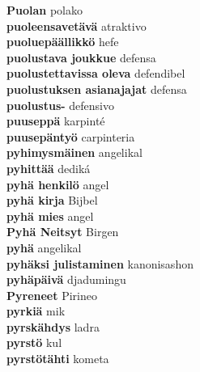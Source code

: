 \textbf{ Puolan  } polako \\
\textbf{ puoleensavetävä  } atraktivo \\
\textbf{ puoluepäällikkö  } hefe \\
\textbf{ puolustava joukkue  } defensa \\
\textbf{ puolustettavissa oleva  } defendibel \\
\textbf{ puolustuksen asianajajat  } defensa \\
\textbf{ puolustus-  } defensivo \\
\textbf{ puuseppä  } karpinté \\
\textbf{ puusepäntyö  } carpinteria \\
\textbf{ pyhimysmäinen  } angelikal \\
\textbf{ pyhittää  } dediká \\
\textbf{ pyhä henkilö  } angel \\
\textbf{ pyhä kirja  } Bijbel \\
\textbf{ pyhä mies  } angel \\
\textbf{ Pyhä Neitsyt  } Birgen \\
\textbf{ pyhä  } angelikal \\
\textbf{ pyhäksi julistaminen  } kanonisashon \\
\textbf{ pyhäpäivä  } djadumingu \\
\textbf{ Pyreneet  } Pirineo \\
\textbf{ pyrkiä  } mik \\
\textbf{ pyrskähdys  } ladra \\
\textbf{ pyrstö  } kul \\
\textbf{ pyrstötähti  } kometa \\
